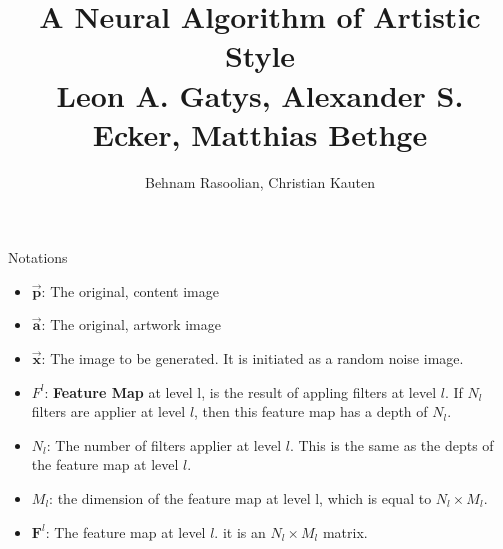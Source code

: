 \documentclass{beamer}
\title{A Neural Algorithm of Artistic Style \\ { \tiny Leon A. Gatys, Alexander S. Ecker, Matthias Bethge}}
\author{Behnam Rasoolian, Christian Kauten}
\institute{Auburn University}
\date{}
\begin{document}

\frame{\titlepage}

\begin{frame}{Notations}
    \begin{itemize}
        \item $\mathbf{\overrightarrow{p}}$: The original, content image
        \item $\mathbf{\overrightarrow{a}}$: The original, artwork image
        \item $\mathbf{\overrightarrow{x}}$: The image to be generated. It is
            initiated as a random noise image.
        \item $F^l$: \textbf{Feature Map} at level l, is the result of appling
            filters at level $l$. If $N_l$ filters are applier at level $l$,
            then this feature map has a depth of $N_l$.
        \item $N_l$: The number of filters applier at level $l$. This is
            the same as the depts of the feature map at level
            $l$.
        \item $M_l$: the dimension of the feature map at level l, which
            is equal to $N_l \times M_l$.
        \item $\mathbf{F}^l$: The feature map at level $l$. it is an
            $N_l \times M_l$ matrix.
    \end{itemize}
\end{frame}
\end{document}
